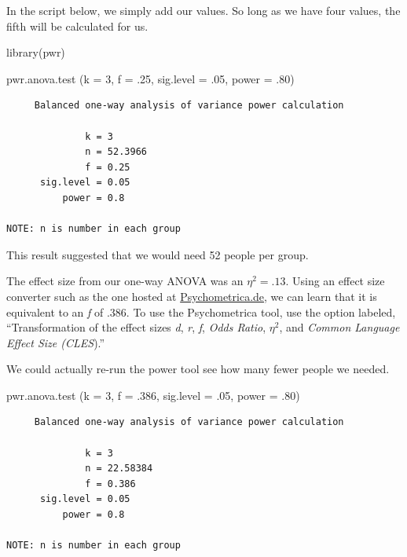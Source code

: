 \documentclass[
  english,
]{book}
\newenvironment{Shaded}{\begin{snugshade}}{\end{snugshade}}
\newcommand{\AttributeTok}[1]{\textcolor[rgb]{0.77,0.63,0.00}{#1}}
\newcommand{\DecValTok}[1]{\textcolor[rgb]{0.00,0.00,0.81}{#1}}
\newcommand{\FunctionTok}[1]{\textcolor[rgb]{0.00,0.00,0.00}{#1}}
\newcommand{\NormalTok}[1]{#1}
\begin{document}
In the script below, we simply add our values. So long as we have four values, the fifth will be calculated for us.

\begin{Shaded}
\begin{Highlighting}[]
\FunctionTok{library}\NormalTok{(pwr)}

\FunctionTok{pwr.anova.test}\NormalTok{ (}\AttributeTok{k =} \DecValTok{3}\NormalTok{, }\AttributeTok{f =}\NormalTok{ .}\DecValTok{25}\NormalTok{, }\AttributeTok{sig.level =}\NormalTok{ .}\DecValTok{05}\NormalTok{, }\AttributeTok{power =}\NormalTok{ .}\DecValTok{80}\NormalTok{)}
\end{Highlighting}
\end{Shaded}

\begin{verbatim}
     Balanced one-way analysis of variance power calculation 

              k = 3
              n = 52.3966
              f = 0.25
      sig.level = 0.05
          power = 0.8

NOTE: n is number in each group
\end{verbatim}

This result suggested that we would need 52 people per group.

The effect size from our one-way ANOVA was an \(\eta^2 = .13\). Using an effect size converter such as the one hosted at \href{https://www.psychometrica.de/effect_size.html}{Psychometrica.de}, we can learn that it is equivalent to an \emph{f} of .386. To use the Psychometrica tool, use the option labeled, ``Transformation of the effect sizes \emph{d}, \emph{r}, \emph{f}, \emph{Odds Ratio}, \(\eta^2\), and \emph{Common Language Effect Size (CLES}).''

We could actually re-run the power tool see how many fewer people we needed.

\begin{Shaded}
\begin{Highlighting}[]
\FunctionTok{pwr.anova.test}\NormalTok{ (}\AttributeTok{k =} \DecValTok{3}\NormalTok{, }\AttributeTok{f =}\NormalTok{ .}\DecValTok{386}\NormalTok{, }\AttributeTok{sig.level =}\NormalTok{ .}\DecValTok{05}\NormalTok{, }\AttributeTok{power =}\NormalTok{ .}\DecValTok{80}\NormalTok{)}
\end{Highlighting}
\end{Shaded}

\begin{verbatim}
     Balanced one-way analysis of variance power calculation 

              k = 3
              n = 22.58384
              f = 0.386
      sig.level = 0.05
          power = 0.8

NOTE: n is number in each group
\end{verbatim}
\end{document}
